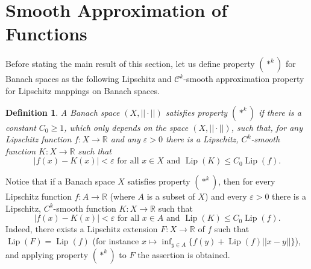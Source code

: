\documentclass[11pt]{amsart}
\newtheorem{defn}[thm]{Definition}
\numberwithin{equation}{section}
\begin{document}
 
\section{Smooth Approximation of Functions}\label{3}

Before stating the main result of this section, let us define property $(*^k)$ for Banach spaces as the following Lipschitz and $\mathcal{C}^k$-smooth approximation property for Lipschitz mappings on Banach spaces.
\begin{defn}
A Banach space $(X, ||\cdot||)$ satisfies  property $(*^k)$  if there is a constant $C_0\ge1$, which only  depends on the space $(X,||\cdot||)$, such that, for any Lipschitz function $f:X\to {\mathbb{R}}$ and any $\varepsilon>0$ there is a Lipschitz, $C^k$-smooth function $K:X\to {\mathbb{R}}$ such that
\begin{equation*}
|f(x)-K(x)|<\varepsilon \text{ for all } x\in X   \text{ and } {\operatorname{Lip}}(K)\leq C_0 {\operatorname{Lip}}(f).
\end{equation*}
\end{defn}
Notice that if a Banach space $X$ satisfies  property  $(*^k)$, then for every Lipschitz function $f: A\to {\mathbb{R}}$
(where  $A$ is a subset of  $X$)   and every $\varepsilon>0$ there is a Lipschitz, $C^k$-smooth function $K:X\to {\mathbb{R}}$ such that
\begin{equation*}
\left\vert f(x)-K(x) \right\vert<\varepsilon \text{ for all } x\in A  \text{ and } {\operatorname{Lip}}(K)\leq C_0 {\operatorname{Lip}}(f).
\end{equation*}
Indeed, there exists a Lipschitz extension $F:X\to{\mathbb{R}}$ of $f$ such that ${\operatorname{Lip}}(F)={\operatorname{Lip}}(f)$  (for instance  $x\mapsto  \inf_{y\in A} \{f(y)+{\operatorname{Lip}}(f)||x-y||\}$), and applying property $(*^k)$ to $F$  the assertion is obtained.
\end{document}
